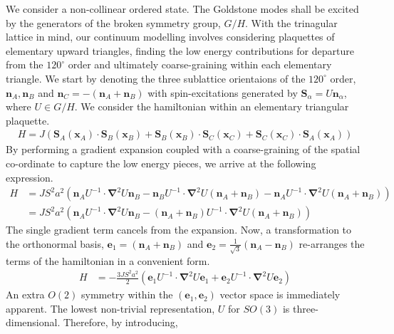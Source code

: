 \documentclass[notitlepage,onecolumn,showpacs,11pt]{revtex4-1}
\newcommand{\mbf}[1]{\mathbf{#1}}
\newcommand{\grad}{\boldsymbol{\nabla}}
\begin{document}
We consider a non-collinear ordered state. The Goldstone modes shall be excited 
by the generators of the broken symmetry group, $G/H$. With the trinagular
lattice in mind, our continuum modelling involves considering plaquettes of 
elementary upward triangles, finding the low energy contributions for 
departure from the $120^\circ$ order and ultimately coarse-graining within 
each elementary triangle. We start by denoting the three sublattice 
orientaions of the $120^\circ$ order, $\mbf{n}_A,\mbf{n}_B$ and 
$\mbf{n}_C = -(\mbf{n}_A+\mbf{n}_B)$ with spin-excitations generated by 
$\mbf{S}_\alpha=U\mbf{n}_\alpha$, where $U\in G/H$. We consider the
hamiltonian within an elementary triangular plaquette.
\begin{equation}
    \begin{aligned}
        H = J \left(\mbf{S}_A(\mbf{x}_A)\cdot\mbf{S}_B(\mbf{x}_B)
        +\mbf{S}_B(\mbf{x}_B)\cdot\mbf{S}_C(\mbf{x}_C)
        +\mbf{S}_C(\mbf{x}_C)\cdot\mbf{S}_A(\mbf{x}_A)
        \right) 
    \end{aligned}
\end{equation}
By performing a gradient expansion coupled with a coarse-graining of the 
spatial co-ordinate to capture the low energy pieces, we arrive at the 
following expression.
\begin{equation}
    \begin{aligned}
        H &= JS^2a^2 \left(\mbf{n}_A U^{-1}\cdot\grad^2U\mbf{n}_B
        -\mbf{n}_B U^{-1}\cdot\grad^2U(\mbf{n}_A+\mbf{n}_B)
        -\mbf{n}_A U^{-1}\cdot\grad^2U(\mbf{n}_A+\mbf{n}_B)
        \right)\\
        &= JS^2a^2 \left(\mbf{n}_A U^{-1}\cdot\grad^2U\mbf{n}_B
        -(\mbf{n}_A+\mbf{n}_B)U^{-1}\cdot\grad^2U(\mbf{n}_A+\mbf{n}_B)
        \right) 
    \end{aligned}
\end{equation}
The single gradient term cancels from the expansion. Now, a transformation 
to the orthonormal basis, $\mbf{e}_1=\left(\mbf{n}_A+\mbf{n}_B\right)$ and 
$\mbf{e}_2=\frac{1}{\sqrt{3}}\left(\mbf{n}_A-\mbf{n}_B\right)$ re-arranges 
the terms of the hamiltonian in a convenient form.
\begin{equation}
    \begin{aligned}
        H &= -\frac{3JS^2a^2}{2} \left(\mbf{e}_1 U^{-1}\cdot\grad^2U\mbf{e}_1
        +\mbf{e}_2 U^{-1}\cdot\grad^2U\mbf{e}_2
        \right)
    \end{aligned}
\end{equation}
An extra $O(2)$ symmetry within the $(\mbf{e}_1,\mbf{e}_2)$ vector space is 
immediately apparent. The lowest non-trivial representation, $U$ for $SO(3)$
is three-dimensional. Therefore, by introducing,
\end{document}
